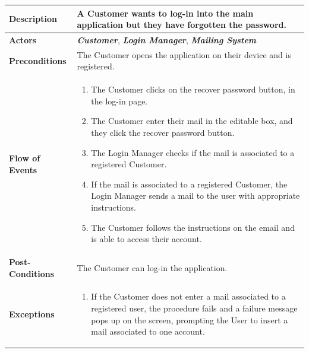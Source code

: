 \documentclass[a4paper, 12pt, oneside]{article}
\begin{document}
\begin{tabularx}{\linewidth}{| l | X |}
	
	\hline
	\textbf{Description} & A Customer wants to log-in into the main application but they have forgotten the password.\\
	

	\hline
	\textbf{Actors} & \textbf{\textit{Customer}}, \textit{\textbf{Login Manager}}, \textit{\textbf{Mailing System}} \\
	
	\hline
	\textbf{Preconditions} & The Customer opens the application on their device and is registered.\\
	
	\hline
	\textbf{Flow of Events} & \parbox{0.7\textwidth}{	
		\begin{enumerate}
			\item The Customer clicks on the recover password button, in the log-in page.
			\item The Customer enter their mail in the editable box, and they click the recover password button.
			\item The Login Manager checks if the mail is associated to a registered Customer.
			\item If the mail is associated to a registered Customer, the Login Manager sends a mail to the user with appropriate instructions.
			\item The Customer follows the instructions on the email and is able to access their account.
	\end{enumerate}}\\
	
	\hline
	\textbf{Post-Conditions} & The Customer can log-in the application.\\
	
	\hline
	\textbf{Exceptions} & \parbox{0.7\textwidth}{ \begin{enumerate}
			\item If the Customer does not enter a mail associated to a registered user, the procedure fails and a failure message pops up on the screen, prompting the User to insert a mail associated to one account.
		\end{enumerate}}\\

	\hline
	
\end{tabularx}
\end{document}
